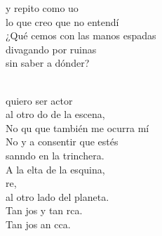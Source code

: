 \begin{cancion}
	y repito como uo\\
	lo que creo que no entendí \\
	¿Qué cemos con las manos espadas\\
	divagando por ruinas \\
	sin saber a dónder?\\\jump\\
	\begin{chorus}%
	 quiero ser actor\\
	al otro do de la escena,\\
	No qu que también me ocurra mí\\
	No y a consentir que estés \\
	sanndo en la trinchera.\\
	A la elta de la esquina,\\
        re,\\
al otro lado del planeta.\\
	Tan jos y tan rca.\\
	Tan jos an cca.\\
	\end{chorus}%
	\jump\\
\end{cancion}%
